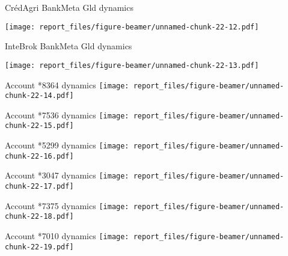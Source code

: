 \documentclass[ignorenonframetext,]{beamer}
\begin{document}
\begin{frame}{CrédAgri BankMeta Gld dynamics}
\protect\hypertarget{cruxe9dagri-bankmeta-gld-dynamics}{}

\texttt{[image: report\_files/figure-beamer/unnamed-chunk-22-12.pdf]}

\end{frame}

\begin{frame}{InteBrok BankMeta Gld dynamics}
\protect\hypertarget{intebrok-bankmeta-gld-dynamics}{}

\texttt{[image: report\_files/figure-beamer/unnamed-chunk-22-13.pdf]}

\end{frame}

\begin{frame}{Account *8364 dynamics
\texttt{[image: report\_files/figure-beamer/unnamed-chunk-22-14.pdf]}}
\protect\hypertarget{account-8364-dynamics-1}{}

\end{frame}

\begin{frame}{Account *7536 dynamics
\texttt{[image: report\_files/figure-beamer/unnamed-chunk-22-15.pdf]}}
\protect\hypertarget{account-7536-dynamics-1}{}

\end{frame}

\begin{frame}{Account *5299 dynamics
\texttt{[image: report\_files/figure-beamer/unnamed-chunk-22-16.pdf]}}
\protect\hypertarget{account-5299-dynamics}{}

\end{frame}

\begin{frame}{Account *3047 dynamics
\texttt{[image: report\_files/figure-beamer/unnamed-chunk-22-17.pdf]}}
\protect\hypertarget{account-3047-dynamics-1}{}

\end{frame}

\begin{frame}{Account *7375 dynamics
\texttt{[image: report\_files/figure-beamer/unnamed-chunk-22-18.pdf]}}
\protect\hypertarget{account-7375-dynamics-1}{}

\end{frame}

\begin{frame}{Account *7010 dynamics
\texttt{[image: report\_files/figure-beamer/unnamed-chunk-22-19.pdf]}}
\protect\hypertarget{account-7010-dynamics-1}{}

\end{frame}
\end{document}

